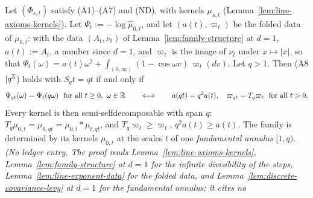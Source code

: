 \begin{lemma}
\label{lem:discrete-covariance-line}
\leanok
{}
Let $(\Phi_{s,t})$ satisfy (A1)--(A7) and (ND), with kernels $\mu_{s,t}$
(Lemma~\ref{lem:line-axioms-kernels}). Let $\Psi_t := -\log\widehat\mu_{0,t}$, and let
$(a(t), \varpi_t)$ be the folded data of $\mu_{0,t}$: with the \Levy{} data $(A_t, \nu_t)$ of
Lemma~\ref{lem:family-structure} at $d = 1$, $a(t) := A_t$, a number since $d = 1$, and
$\varpi_t$ is the image of $\nu_t$ under $x \mapsto |x|$, so that
$\Psi_t(\omega) = a(t)\omega^2 + \int_{(0,\infty)}(1 - \cos\omega v)\,\varpi_t(dv)$. Let $q > 1$.
Then (A8$|q^{\mathbb{Z}}$) holds with $S_qt = qt$ if and only if
\[
  \Psi_{qt}(\omega) = \Psi_t(q\omega) \ \text{ for all } t \ge 0,\ \omega \in \mathbb{R}
  \qquad\Longleftrightarrow\qquad
  a(qt) = q^2a(t), \quad \varpi_{qt} = T_q\varpi_t \ \text{ for all } t > 0 .
\]
Every kernel is then semi-selfdecomposable with span $q$: $T_q\mu_{0,t} = \mu_{0,qt} =
\mu_{0,t} * \mu_{t,qt}$, and $T_q\varpi_t \ge \varpi_t$, $q^2a(t) \ge a(t)$. The family is
determined by its kernels $\mu_{0,t}$ at the scales $t$ of one \emph{fundamental annulus}
$[1, q)$.
\statusT\quad\emph{(No ledger entry. The proof reads Lemma~\ref{lem:line-axioms-kernels},
Lemma~\ref{lem:family-structure} at $d = 1$ for the infinite divisibility of the steps,
Lemma~\ref{lem:line-exponent-data} for the folded data, and
Lemma~\ref{lem:discrete-covariance-levy} at $d = 1$ for the fundamental annulus; it cites no
}
\end{lemma}

